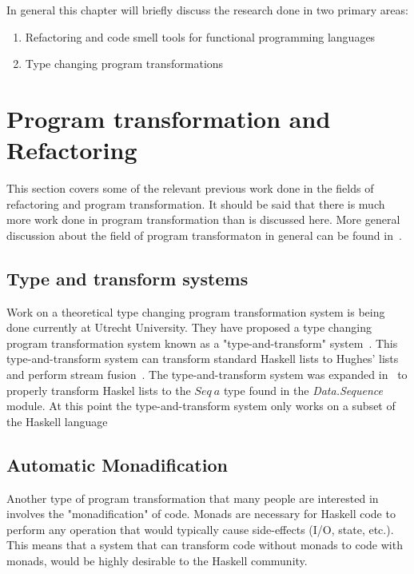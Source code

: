 In general this chapter will briefly discuss the research done in two primary areas:

\begin{enumerate}
\item Refactoring and code smell tools for functional programming languages
\item Type changing program transformations 
\end{enumerate}

\section{Program transformation and Refactoring}

This section covers some of the relevant previous work done in the fields of refactoring and program transformation. It should be said that there is much more work done in program transformation than is discussed here. More general discussion about the field of program transformaton in general can be found in~\citep{visserSurvey,transformationIntro}.

\subsection{Type and transform systems}

Work on a theoretical type changing program transformation system is being done currently at Utrecht University. They have proposed a type changing program transformation system known as a "type-and-transform" system~\citep{typeAndTransform}. This type-and-transform system can transform standard Haskell lists to Hughes' lists and perform stream fusion~\citep{typeAndTransform}. The type-and-transform system was expanded in~\citep{typeAndTransformPatterns} to properly transform Haskel lists to the $Seq~a$ type found in the \textit{Data.Sequence} module. At this point the type-and-transform system only works on a subset of the Haskell language~\citep{typeAndTransform}

\subsection{Automatic Monadification}\label{erwigMonad}

Another type of program transformation that many people are interested in involves the "monadification" of code. Monads are necessary for Haskell code to perform any operation that would typically cause side-effects (I/O, state, etc.). This means that a system that can transform code without monads to code with monads, would be highly desirable to the Haskell community.

